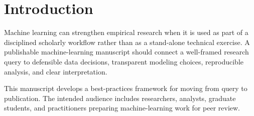 \section{Introduction}

Machine learning can strengthen empirical research when it is used as part of a disciplined scholarly workflow rather than as a stand-alone technical exercise. A publishable machine-learning manuscript should connect a well-framed research query to defensible data decisions, transparent modeling choices, reproducible analysis, and clear interpretation.

This manuscript develops a best-practices framework for moving from query to publication. The intended audience includes researchers, analysts, graduate students, and practitioners preparing machine-learning work for peer review.
